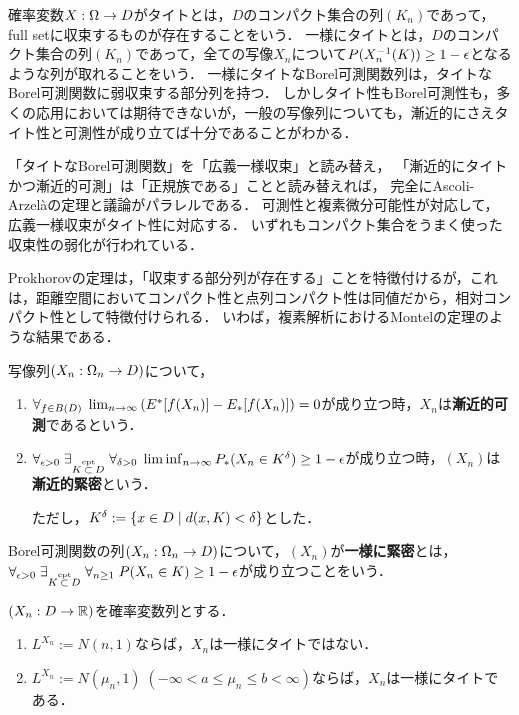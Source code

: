 \documentclass[uplatex,dvipdfmx]{jsreport}
\begin{document}
\begin{tcolorbox}[colframe=ForestGreen, colback=ForestGreen!10!white,breakable,colbacktitle=ForestGreen!40!white,coltitle=black,fonttitle=\bfseries\sffamily,
title=]
    確率変数$X:\Omega\to D$がタイトとは，$D$のコンパクト集合の列$(K_n)$であって，full setに収束するものが存在することをいう．
    一様にタイトとは，$D$のコンパクト集合の列$(K_n)$であって，全ての写像$X_n$について$P(X_n^{-1}(K))\ge 1-\epsilon$となるような列が取れることをいう．
    一様にタイトなBorel可測関数列は，タイトなBorel可測関数に弱収束する部分列を持つ．
    しかしタイト性もBorel可測性も，多くの応用においては期待できないが，一般の写像列についても，漸近的にさえタイト性と可測性が成り立てば十分であることがわかる．

    「タイトなBorel可測関数」を「広義一様収束」と読み替え，
    「漸近的にタイトかつ漸近的可測」は「正規族である」ことと読み替えれば，
    完全にAscoli-Arzelàの定理と議論がパラレルである．
    可測性と複素微分可能性が対応して，広義一様収束がタイト性に対応する．
    いずれもコンパクト集合をうまく使った収束性の弱化が行われている．

    Prokhorovの定理は，「収束する部分列が存在する」ことを特徴付けるが，これは，距離空間においてコンパクト性と点列コンパクト性は同値だから，相対コンパクト性として特徴付けられる．
    いわば，複素解析におけるMontelの定理のような結果である．
\end{tcolorbox}

\begin{definition}
    写像列$(X_n:\Omega_n\to D)$について，
    \begin{enumerate}
        \item $\forall_{f\in B(D)}\;\lim_{n\to\infty}\left(E^*[f(X_n)]-E_*[f(X_n)]\right)=0$が成り立つ時，$X_n$は\textbf{漸近的可測}であるという．
        \item $\forall_{\epsilon>0}\;\exists_{K\overset{\textrm{cpt}}{\subset} D}\;\forall_{\delta>0}\;\liminf_{n\to\infty}P_*(X_n\in K^\delta)\ge 1-\epsilon$が成り立つ時，$(X_n)$は\textbf{漸近的緊密}という．
        
        ただし，$K^\delta:=\left\{x\in D\mid d(x,K)<\delta\right\}$とした．
    \end{enumerate}
    Borel可測関数の列$(X_n:\Omega_n\to D)$について，$(X_n)$が\textbf{一様に緊密}とは，$\forall_{\epsilon>0}\;\exists_{K\overset{\textrm{cpt}}{\subset} D}\;\forall_{n\ge 1}\;P(X_n\in K)\ge 1-\epsilon$が成り立つことをいう．
\end{definition}

\begin{example}[一様にタイトなBorel可測関数列]
    $(X_n:D\to\mathbb{R})$を確率変数列とする．
    \begin{enumerate}
        \item $L^{X_n}:=N(n,1)$ならば，$X_n$は一様にタイトではない．
        \item $L^{X_n}:=N(\mu_n,1)\;(-\infty<a\le\mu_n\le b<\infty)$ならば，$X_n$は一様にタイトである．
    \end{enumerate}
\end{example}
\end{document}
